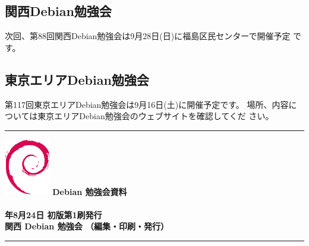 \documentclass[mingoth,a4paper]{jsarticle}
\newcommand{\debmtgyear}{2014}
\newcommand{\debmtgdate}{24}
\newcommand{\debmtgmonth}{8}
\begin{document}

\subsection{関西Debian勉強会}

次回、第88回関西Debian勉強会は9月28日(日)に福島区民センターで開催予定
です。

\subsection{東京エリアDebian勉強会}

第117回東京エリアDebian勉強会は9月16日(土)に開催予定です。
場所、内容については東京エリアDebian勉強会のウェブサイトを確認してくだ
さい。

%

\printindex

 \begin{minipage}[b]{0.2\hsize}
 \end{minipage}
 \begin{minipage}[b]{0.8\hsize}

 \vspace*{15cm}
 \rule{\hsize}{1mm}
 \vspace{2mm}
 \includegraphics[width=2cm]{image200502/openlogo-nd.eps}
 \noindent \Large \bfseries{Debian 勉強会資料}\\ \\
 \noindent \normalfont \debmtgyear{}年\debmtgmonth{}月\debmtgdate{}日 \hspace{5mm}  初版第1刷発行\\
 \noindent \normalfont 関西 Debian 勉強会 （編集・印刷・発行）\\
 \rule{\hsize}{1mm}
 \end{minipage}
\end{document}
